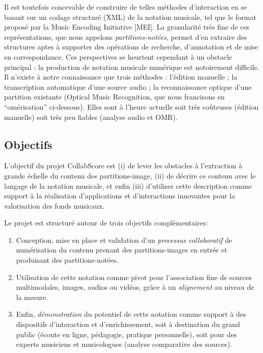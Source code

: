 \documentclass[11pt]{article}
\begin{document}
Il est toutefois concevable de construire de telles méthodes d’interaction 
en se basant sur un codage structuré (XML) de la notation musicale, 
tel que le format  proposé par la Music 
Encoding Initiative [MEI]. La granularité très fine de ces représentations, que nous 
appelons \emph{partitions-notées}, permet d’en extraire des structures aptes 
à supporter des opérations de recherche, d’annotation et de mise en correspondance. 
Ces perspectives se heurtent cependant à un obstacle principal : la production de notation 
musicale numérique est notoirement difficile. Il n’existe à notre connaissance que trois 
méthodes : l’édition manuelle ; la transcription automatique d’une source audio ; 
la reconnaissance optique d’une partition existante (Optical Music Recognition, que nous francisons
en ``omérisation'' ci-dessous). 
Elles sont à l'heure actuelle 
soit très coûteuses (édition manuelle) soit très peu fiables (analyse audio et OMR). 

\subsection{Objectifs}

L’objectif du projet CollabScore est 
(i) de lever les obstacles à l’extraction à grande échelle du contenu des partitions-image, 
(ii) de décrire ce contenu avec le langage de la notation musicale, et enfin 
(iii) d’utiliser cette description comme support à la réalisation d’applications et d’interactions 
innovantes pour la valorisation des fonds musicaux.

 
Le projet est structuré autour de trois objectifs complémentaires:
\begin{enumerate}

  \item Conception, mise en place et validation d’un \emph{processus collaboratif} de numérisation du contenu 
      prenant des partitions-images en entrée et produisant des partitions-notées.
  \item Utilisation de cette notation comme pivot pour l’association fine de sources multimodales, 
     images, audios ou vidéos, grâce à un \emph{alignement} au niveau de la mesure.
   \item Enfin, \emph{démonstration} du potentiel de cette notation comme support à des dispositifs d’interaction et 
     d’enrichissement, soit à destination du grand public (écoute en ligne, pédagogie, pratique personnelle), 
      soit pour des experts musiciens et musicologues (analyse comparative des sources).
\end{enumerate}
\end{document}
